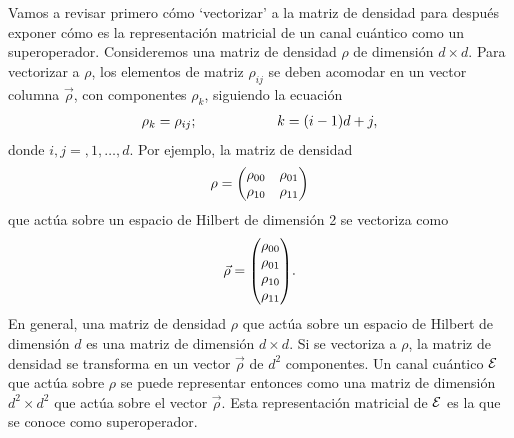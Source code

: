 Vamos a revisar primero cómo `vectorizar' a la matriz de densidad 
para después exponer cómo es la representación matricial de
un canal cuántico como un superoperador.
Consideremos una matriz de densidad $\rho$ de dimensión $d\times d$.
Para vectorizar a $\rho$, los elementos de matriz $\rho_{ij}$ 
se deben acomodar en un vector columna $\vec{\rho}$, con componentes 
$\rho_k$, siguiendo la ecuación~\citep{bengtsson_zyczkowski_2017}
\begin{align}
\rho_k=\rho_{ij};\hspace{2cm} k=\qty(i-1)d+j,
\label{eq:matrix-to-vector}
\end{align}
donde $i,j=,1,\ldots,d$. Por ejemplo, la matriz de densidad
\begin{align}
\rho=\mqty(\rho_{00}&\rho_{01}\\ \rho_{10}&\rho_{11})
\end{align}
que actúa sobre un espacio de Hilbert de dimensión 2 se vectoriza como 
\begin{align}
\vec{\rho}=\mqty(\rho_{00}\\ \rho_{01}\\ \rho_{10}\\ \rho_{11}).
\end{align}
En general, una matriz de densidad $\rho$ que actúa 
sobre un espacio de Hilbert de dimensión $d$ es 
una matriz de dimensión $d\times d$. Si se vectoriza a $\rho$, la matriz 
de densidad se transforma en un vector $\vec{\rho}$ de $d^2$ 
componentes. Un canal cuántico $\mathcal{E}$ que actúa sobre $\rho$ se puede
representar entonces como una matriz de dimensión $d^2\times d^2$ 
que actúa sobre el vector $\vec{\rho}$. Esta representación matricial de 
$\mathcal{E}$ es la que se conoce como superoperador.

